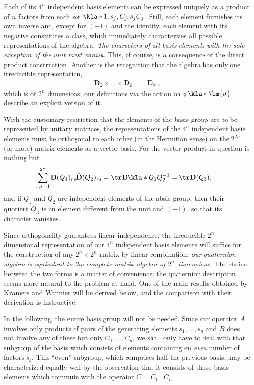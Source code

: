 \documentclass[english, parskip=full]{scrartcl}
\begin{document}
Each of its $4^n$ independent basis elements can be expressed uniquely as a product of $n$ factors from each set $\kla*{1,s_j,C_j,s_jC_j}$.
Still, each element furnishes its own inverse and, except for $(-1)$ and the identity, each element with its negative constitutes a class, which immediately characterizes all possible representations of the algebra: \emph{The characters of all basis elements with the sole exception of the unit must vanish}.
This, of course, is a consequence of the direct product construction.
Another is the recognition that the algebra has only one irreducible representation,
\begin{align}
\textbf{D}_2\times \dots \times \textbf{D}_2 &= \textbf{D}_{2^n},
\end{align}
which is of $2^n$ dimensions; our definitions via the action on $\psi\kla*{\bm{\sigma}}$ describe an explicit version of it.

With the customary restriction that the elements of the basis group are to be represented by unitary matrices, the representations of the $4^n$ independent basis elements must be orthogonal to each other (in the Hermitian sense) on the $2^{2n}$ (or more) matrix elements as a vector basis.
For the vector product in question is nothing but
\begin{align}
\sum_{r,s=1}^{2^n} \textbf{D}(Q_1)_{rs} \bar{\textbf{D}}(Q_2)_{rs} &= \tr \textbf{D}\kla*{Q_1Q_2^{-1}} = \tr \textbf{D}(Q_3),
\end{align} 
and if $Q_1$ and $Q_2$ are independent elements of the absis group, then their quotient $Q_3$ is an element different from the unit and $(-1)$, so that its character vanishes.

Since orthogonality guarantees linear independence, the irreducible $2^n$-dimensional representation of our $4^n$ independent basis elements will suffice for the construction of any $2^n\times 2^n$ matrix by linear combination; \emph{our quaternion algebra is equivalent to the complete matrix algebra of $2^n$ dimensions}.
The choice between the two forms is a matter of convenience; the quaternion description seems more natural to the problem at hand.
One of the main results obtained by Kramers and Wannier will be derived below, and the comparison with their derivation is instructive.

In the following, the entire basis group will not be needed.
Since our operator $A$ involves only products of pairs of the generating elements $s_1,\dots,s_n$ and $B$ does not involve any of these but only $C_1,\dots,C_n$, we shall only have to deal with that subgroup of the basis which consists of elements containing en \emph{even} number of factors $s_j$.
This ``even'' subgroup, which comprises half the previous basis, may be characterized equally well by the observation that it consists of those basis elements which commute with the operator $C=C_1\dots C_n$.
\end{document}
